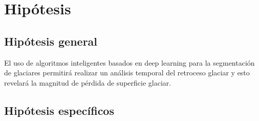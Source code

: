 \section{Hipótesis}

\subsection{Hipótesis general}
El uso de algoritmos inteligentes basados en deep learning para la segmentación de glaciares permitirá realizar un análisis temporal del retroceso glaciar y esto revelará la magnitud de pérdida de superficie glaciar.
\subsection{Hipótesis específicos}
\begin{itemize}
	
	
	
	
	

\end{itemize}
